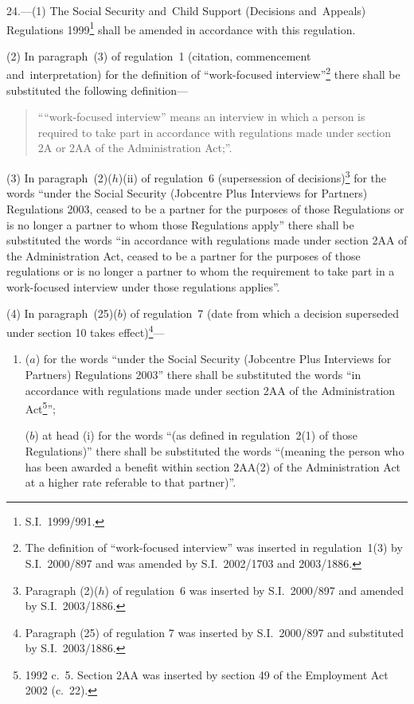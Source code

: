 \documentclass[12pt,a4paper]{article}
\begin{document}
24.---(1)  The Social Security and~Child Support (Decisions and~Appeals) Regulations 1999\footnote{S.I.~1999/991.} shall be amended in accordance with this regulation.

(2) In paragraph~(3) of regulation~1 (citation, commencement and~interpretation) for the definition of “work-focused interview”\footnote{The definition of “work-focused interview” was inserted in regulation~1(3) by S.I.~2000/897 and was amended by S.I.~2002/1703 and 2003/1886.} there shall be substituted the following definition—
\begin{quotation}
““work-focused interview” means an interview in which a person is required to take part in accordance with regulations made under section 2A or 2AA of the Administration Act;”.
\end{quotation}

(3) In paragraph~(2)($h$)(ii)  of regulation~6 (supersession of decisions)\footnote{Paragraph (2)($h$) of regulation~6 was inserted by S.I.~2000/897 and amended by S.I.~2003/1886.} for the words “under the Social Security (Jobcentre Plus Interviews for Partners) Regulations 2003, ceased to be a partner for the purposes of those Regulations or is no longer a partner to whom those Regulations apply” there shall be substituted the words “in accordance with regulations made under section 2AA of the Administration Act, ceased to be a partner for the purposes of those regulations or is no longer a partner to whom the requirement to take part in a work-focused interview under those regulations applies”.

(4) In paragraph~(25)($b$)  of regulation~7 (date from which a decision superseded under section 10 takes effect)\footnote{Paragraph (25) of regulation 7 was inserted by S.I.~2000/897 and substituted by S.I.~2003/1886.}—
\begin{enumerate}\item[]
($a$) for the words “under the Social Security (Jobcentre Plus Interviews for Partners) Regulations 2003” there shall be substituted the words “in accordance with regulations made under section 2AA of the Administration Act\footnote{1992 c.~5. Section 2AA was inserted by section 49 of the Employment Act 2002 (c.~22).}”;

($b$) at head (i)  for the words “(as defined in regulation~2(1) of those Regulations)” there shall be substituted the words “(meaning the person who has been awarded a benefit within section 2AA(2) of the Administration Act at a higher rate referable to that partner)”.
\end{enumerate}
\end{document}
